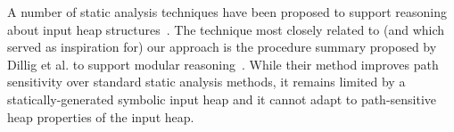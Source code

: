 


A number of static analysis techniques have been proposed
to support reasoning about input heap structures~\cite{}. The technique
most closely related to (and which served as inspiration for) our approach
is the procedure summary proposed by Dillig et al. to support modular
reasoning~\cite{Dillig:2011}.  While
their method improves path sensitivity over standard static
analysis methods, it remains limited by a statically-generated
symbolic input heap and it cannot adapt to path-sensitive heap
properties of the input heap.






